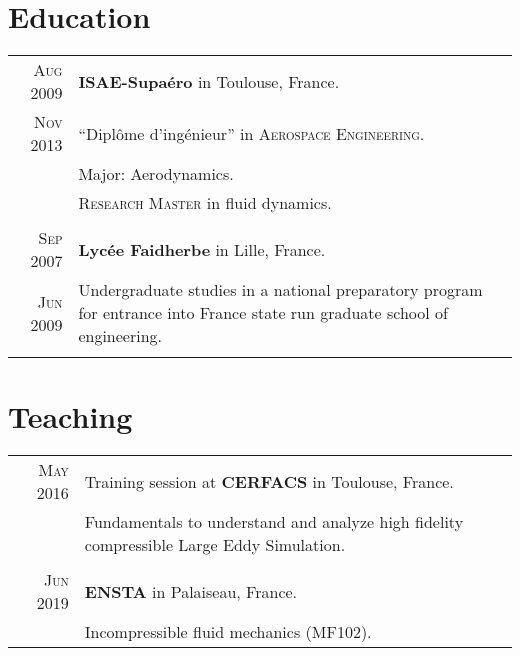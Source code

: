 \documentclass[a4paper,10pt]{article}
\begin{document}
\section{Education}
\begin{tabular}{r|p{15cm}}
\textsc{Aug} 2009 & \textbf{ISAE-Supa\'ero} in Toulouse, France. \\
\textsc{Nov} 2013 & ``Dipl\^{o}me d'ing\'{e}nieur'' in \textsc{Aerospace Engineering}. \\
                  & Major: Aerodynamics. \\
                  & \textsc{Research Master} in fluid dynamics. \\ 
                  \multicolumn{2}{c}{} \\

\textsc{Sep} 2007 & \textbf{Lycée Faidherbe} in Lille, France. \\ 
\textsc{Jun} 2009 & Undergraduate studies in a national preparatory program for entrance into France state run graduate school of engineering. \\
                  \multicolumn{2}{c}{} \\
\end{tabular}

\section{Teaching}
\begin{tabular}{r|p{15cm}}
    \textsc{May} 2016 & Training session at \textbf{CERFACS} in Toulouse, France. \\
                      & Fundamentals to understand and analyze high fidelity compressible Large Eddy Simulation. \\
                      \multicolumn{2}{c}{} \\
    
    \textsc{Jun} 2019 & \textbf{ENSTA} in Palaiseau, France. \\ 
                      & Incompressible fluid mechanics (MF102). \\
    \end{tabular}
\end{document}
